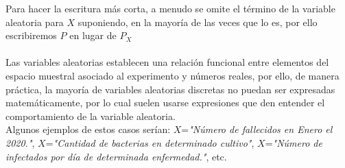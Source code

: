Para hacer la escritura más corta, a menudo se omite el término de la variable aleatoria para $X$ suponiendo, en la mayoría de las veces que lo es, por ello escribiremos $P$ en lugar de $P_X$\\\\
Las variables aleatorias establecen una relación funcional entre elementos del espacio muestral asociado al experimento y números reales, por ello, de manera práctica, la mayoría de variables aleatorias discretas no puedan ser expresadas matemáticamente, por lo cual suelen usarse expresiones que den entender el comportamiento de la variable aleatoria. \\Algunos ejemplos de estos casos serían: $X$=\textit{"Número de fallecidos en Enero el 2020."}, $X$=\textit{"Cantidad de bacterias en determinado cultivo"}, $X$=\textit{"Número de infectados por día de determinada enfermedad."}, etc.\\

